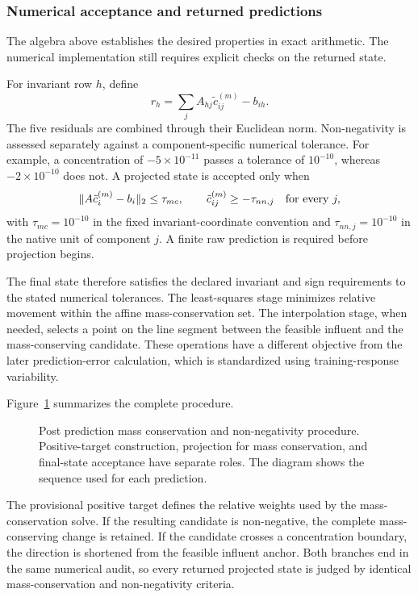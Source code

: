 \subsubsection{Numerical acceptance and returned predictions}

The algebra above establishes the desired properties in exact arithmetic. The numerical implementation still requires explicit checks on the returned state.

For invariant row $h$, define
\[
r_h=\sum_jA_{hj}\tilde c_{ij}^{(m)}-b_{ih}.
\]
The five residuals are combined through their Euclidean norm. Non-negativity is assessed separately against a component-specific numerical tolerance. For example, a concentration of $-5\times10^{-11}$ passes a tolerance of $10^{-10}$, whereas $-2\times10^{-10}$ does not. A projected state is accepted only when
\begin{equation}
\equationname{Numerical mass conservation and non-negativity acceptance checks}
\|A\tilde c_i^{(m)}-b_i\|_2\leq\tau_{mc},\qquad
\tilde c_{ij}^{(m)}\geq-\tau_{nn,j}\quad\text{for every }j,
\label{eq:projection_numerical_acceptance}
\end{equation}
with $\tau_{mc}=10^{-10}$ in the fixed invariant-coordinate convention and
$\tau_{nn,j}=10^{-10}$ in the native unit of component $j$. A finite raw prediction is required before projection begins.

The final state therefore satisfies the declared invariant and sign requirements to the stated numerical tolerances. The least-squares stage minimizes relative movement within the affine mass-conservation set. The interpolation stage, when needed, selects a point on the line segment between the feasible influent and the mass-conserving candidate. These operations have a different objective from the later prediction-error calculation, which is standardized using training-response variability.

Figure~\ref{fig:projection_acceptance_flow} summarizes the complete procedure.

\begin{figure}[htbp]
\centering

\caption{Post prediction mass conservation and non-negativity procedure. Positive-target construction, projection for mass conservation, and final-state acceptance have separate roles. The diagram shows the sequence used for each prediction.}
\label{fig:projection_acceptance_flow}
\end{figure}

The provisional positive target defines the relative weights used by the mass-conservation solve. If the resulting candidate is non-negative, the complete mass-conserving change is retained. If the candidate crosses a concentration boundary, the direction is shortened from the feasible influent anchor. Both branches end in the same numerical audit, so every returned projected state is judged by identical mass-conservation and non-negativity criteria.

